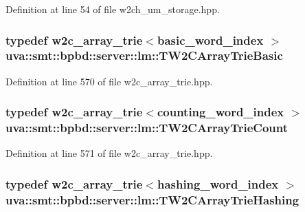 Definition at line 54 of file w2ch\+\_\+um\+\_\+storage.\+hpp.

\hypertarget{namespaceuva_1_1smt_1_1bpbd_1_1server_1_1lm_a0ff9ccd8ef0d75734e4823d7da6d1c50}{}
\subsubsection[{T\+W2\+C\+Array\+Trie\+Basic}]{\setlength{\rightskip}{0pt plus 5cm}typedef {\bf w2c\+\_\+array\+\_\+trie}$<${\bf basic\+\_\+word\+\_\+index} $>$ {\bf uva\+::smt\+::bpbd\+::server\+::lm\+::\+T\+W2\+C\+Array\+Trie\+Basic}}\label{namespaceuva_1_1smt_1_1bpbd_1_1server_1_1lm_a0ff9ccd8ef0d75734e4823d7da6d1c50}


Definition at line 570 of file w2c\+\_\+array\+\_\+trie.\+hpp.

\hypertarget{namespaceuva_1_1smt_1_1bpbd_1_1server_1_1lm_a80173bfa2d9877705cbdea563f932ee3}{}
\subsubsection[{T\+W2\+C\+Array\+Trie\+Count}]{\setlength{\rightskip}{0pt plus 5cm}typedef {\bf w2c\+\_\+array\+\_\+trie}$<${\bf counting\+\_\+word\+\_\+index} $>$ {\bf uva\+::smt\+::bpbd\+::server\+::lm\+::\+T\+W2\+C\+Array\+Trie\+Count}}\label{namespaceuva_1_1smt_1_1bpbd_1_1server_1_1lm_a80173bfa2d9877705cbdea563f932ee3}


Definition at line 571 of file w2c\+\_\+array\+\_\+trie.\+hpp.

\hypertarget{namespaceuva_1_1smt_1_1bpbd_1_1server_1_1lm_ab3c0d99d3a11f3d2ae2e42126db080c3}{}
\subsubsection[{T\+W2\+C\+Array\+Trie\+Hashing}]{\setlength{\rightskip}{0pt plus 5cm}typedef {\bf w2c\+\_\+array\+\_\+trie}$<${\bf hashing\+\_\+word\+\_\+index} $>$ {\bf uva\+::smt\+::bpbd\+::server\+::lm\+::\+T\+W2\+C\+Array\+Trie\+Hashing}}\label{namespaceuva_1_1smt_1_1bpbd_1_1server_1_1lm_ab3c0d99d3a11f3d2ae2e42126db080c3}


